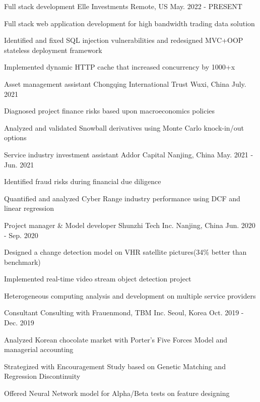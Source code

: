 \begin{cventries}
  \cventry
    {Full stack development}
    {Elle Investments}
    {Remote, US}
    {May. 2022 - PRESENT}
    {
      \begin{cvitems}
        \item {Full stack web application development for high bandwidth trading data solution}
        \item {Identified and fixed SQL injection vulnerabilities and redesigned MVC+OOP stateless deployment framework}
        \item {Implemented dynamic HTTP cache that increased concurrency by 1000+x}
      \end{cvitems}
    }

  \cventry
    {Asset management assistant}
    {Chongqing International Trust}
    {Wuxi, China}
    {July. 2021}
    {
      \begin{cvitems}
        \item {Diagnosed project finance risks based upon macroeconomics policies}
        \item {Analyzed and validated Snowball derivatives using Monte Carlo knock-in/out options}
      \end{cvitems}
    }

  \cventry
    {Service industry investment assistant}
    {Addor Capital}
    {Nanjing, China}
    {May. 2021 - Jun. 2021}
    {
      \begin{cvitems}
        \item {Identified fraud risks during financial due diligence}
        \item {Quantified and analyzed Cyber Range industry performance using DCF and linear regression}
      \end{cvitems}
    }

  \cventry
    {Project manager \& Model developer}
    {Shunzhi Tech Inc.}
    {Nanjing, China}
    {Jun. 2020 - Sep. 2020}
    {
      \begin{cvitems}
        \item {Designed a change detection model on VHR satellite pictures(34\% better than benchmark)}
        \item {Implemented real-time video stream object detection project}
        \item {Heterogeneous computing analysis and development on multiple service providers}
      \end{cvitems}
    }

  \cventry
    {Consultant}
    {Consulting with Frauenmond, TBM Inc.}
    {Seoul, Korea}
    {Oct. 2019 - Dec. 2019}
    {
      \begin{cvitems}
        \item {Analyzed Korean chocolate market with Porter's Five Forces Model and managerial accounting}
        \item {Strategized with Encouragement Study based on Genetic Matching and Regression Discontinuity}
        \item {Offered Neural Network model for Alpha/Beta tests on feature designing}
      \end{cvitems}
    }


\end{cventries}
